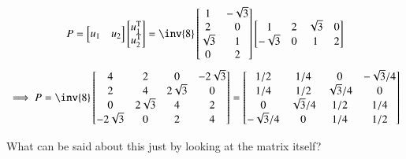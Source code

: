 \documentclass{article}      %
\newcommand{\T}[0]{{\text{T}}}
\begin{document}
\[
P =
\begin{bmatrix}
u_1 & u_2 \\
\end{bmatrix}
\begin{bmatrix}
u_1^\T \\
u_2^\T \\
\end{bmatrix}
=
\inv{8}
\begin{bmatrix}
1 & -\sqrt{3} \\
2 & 0 \\
\sqrt{3} & 1 \\
0 & 2 \\
\end{bmatrix}
\begin{bmatrix}
1 & 2 & \sqrt{3} & 0 \\
-\sqrt{3} & 0 & 1 & 2 \\
\end{bmatrix}
\]
\[
\implies
P =
\inv{8}
\begin{bmatrix}
4 & 2 & 0 & -2\sqrt{3} \\
2 & 4 & 2\sqrt{3} & 0 \\
0 & 2\sqrt{3} & 4 & 2 \\
-2\sqrt{3} & 0 & 2 & 4 \\
\end{bmatrix}
=
\begin{bmatrix}
1/2 & 1/4 & 0 & -\sqrt{3}/4 \\
1/4 & 1/2 & \sqrt{3}/4 & 0 \\
0 & \sqrt{3}/4 & 1/2 & 1/4 \\
-\sqrt{3}/4 & 0 & 1/4 & 1/2 \\
\end{bmatrix}
\]

What can be said about this just by looking at the matrix itself?
\end{document}
